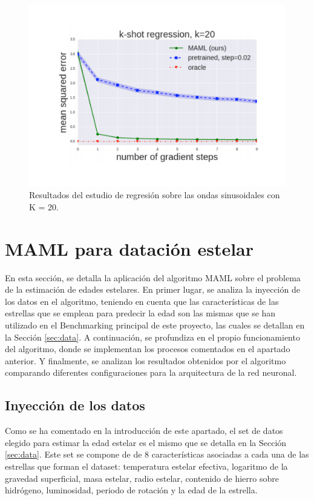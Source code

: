 \begin{figure}[H]
\begin{center}
 \includegraphics[width=0.8\linewidth]{Figuras/MAML/sinusoid_3.pdf}
\end{center}
\caption{Resultados del estudio de regresión sobre las ondas sinusoidales con K = 20.}
 \label{fig:sinusoid_results_3}
\end{figure}

\section{MAML para datación estelar}
\label{sec:maml}

En esta sección, se detalla la aplicación del algoritmo MAML sobre el problema de la estimación de edades estelares. En primer lugar, se analiza la inyección de los datos en el algoritmo, teniendo en cuenta que las características de las estrellas que se emplean para predecir la edad son las mismas que se han utilizado en el Benchmarking principal de este proyecto, las cuales se detallan en la Sección \ref{sec:data}. A continuación, se profundiza en el propio funcionamiento del algoritmo, donde se implementan los procesos comentados en el apartado anterior. Y finalmente, se analizan los resultados obtenidos por el algoritmo comparando diferentes configuraciones para la arquitectura de la red neuronal.


\subsection{Inyección de los datos} 

Como se ha comentado en la introducción de este apartado, el set de datos elegido para estimar la edad estelar es el mismo que se detalla en la Sección \ref{sec:data}. Este set se compone de de 8 características asociadas a cada una de las estrellas que forman el dataset: temperatura estelar efectiva, logaritmo de la gravedad superficial, masa estelar, radio estelar, contenido de hierro sobre hidrógeno, luminosidad, periodo de rotación y la edad de la estrella.

